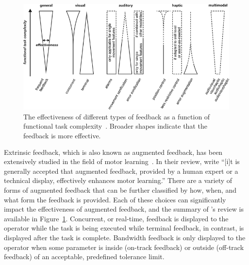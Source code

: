 \begin{figure}[!b]
    \begin{center}
        \includegraphics[width=\linewidth]{figures/Introduction/sigrist_review.png}
        \caption[The effectiveness of different types of feedback as a function of functional task complexity]{The effectiveness of different types of feedback as a function of functional task complexity~\citep{sigrist_augmented_2013}. Broader shapes indicate that the feedback is more effective.}
        \label{figure:sigrist_review}
    \end{center}
\end{figure}

Extrinsic feedback, which is also known as augmented feedback, has been extensively studied in the field of motor learning~\citep{sigrist_augmented_2013}.
In their \citeyear{sigrist_augmented_2013} review, \citeauthor{sigrist_augmented_2013} write ``[i]t is generally accepted that augmented feedback, provided by a human expert or a technical display, effectively enhances motor learning.''
There are a variety of forms of augmented feedback that can be further classified by how, when, and what form the feedback is provided.
Each of these choices can significantly impact the effectiveness of augmented feedback, and the summary of \citeauthor{sigrist_augmented_2013}'s review is available in Figure~\ref{figure:sigrist_review}.
Concurrent, or real-time, feedback is displayed to the operator while the task is being executed while terminal feedback, in contrast, is displayed after the task is complete.
Bandwidth feedback is only displayed to the operator when some parameter is inside (on-track feedback) or outside (off-track feedback) of an acceptable, predefined tolerance limit.

